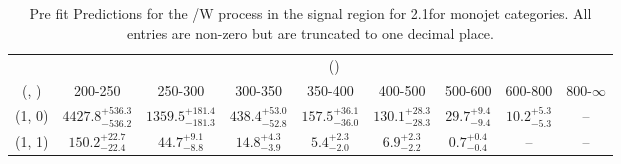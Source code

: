 \begin{table}[h!]
\tiny
\centering
\caption{Pre fit Predictions for the \ttbar/W process in the signal region for 2.1\ifb for monojet categories. All entries are non-zero but are truncated to one decimal place.\label{tab:predsepnaive_sig_ttw_mono}}
\begin{tabular}
{ccccccccc}
	\hline\hline
	& \multicolumn{8}{c}{\scalht (\gev)} \\ 
	 (\njet,  \nb) & 200-250 & 250-300 & 300-350 & 350-400 & 400-500 & 500-600 & 600-800 & 800-$\infty$ \\ [0.8ex] 
\hline
	(1, 0) & $4427.8^{+ 536.3 }_{- 536.2 }$ & $1359.5^{+ 181.4 }_{- 181.3 }$ & $438.4^{+ 53.0 }_{- 52.8 }$ & $157.5^{+ 36.1 }_{- 36.0 }$ & $130.1^{+ 28.3 }_{- 28.3 }$ & $29.7^{+ 9.4 }_{- 9.4 }$ & $10.2^{+ 5.3 }_{- 5.3 }$ & -- \\[0.5ex] 
	(1, 1) & $150.2^{+ 22.7 }_{- 22.4 }$ & $44.7^{+ 9.1 }_{- 8.8 }$ & $14.8^{+ 4.3 }_{- 3.9 }$ & $5.4^{+ 2.3 }_{- 2.0 }$ & $6.9^{+ 2.3 }_{- 2.2 }$ & $0.7^{+ 0.4 }_{- 0.4 }$ & -- & -- \\[0.5ex] 
	\hline
	\hline
\end{tabular}
\end{table}
